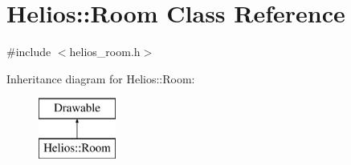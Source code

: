 \hypertarget{class_helios_1_1_room}{}\section{Helios\+:\+:Room Class Reference}
\label{class_helios_1_1_room}


{\ttfamily \#include $<$helios\+\_\+room.\+h$>$}

Inheritance diagram for Helios\+:\+:Room\+:\begin{figure}[H]
\begin{center}
\leavevmode
\includegraphics[height=2.000000cm]{class_helios_1_1_room}
\end{center}
\end{figure}
